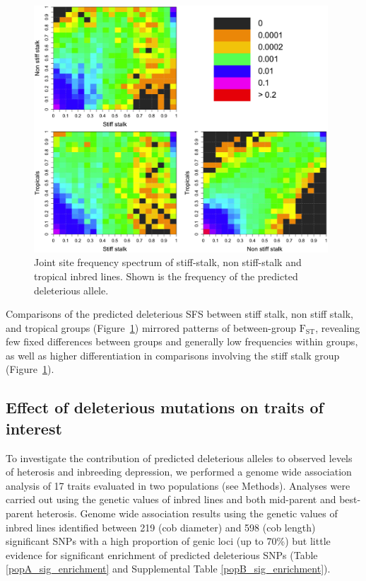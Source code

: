 \documentclass[12pt]{article}
\begin{document}
\begin{figure}[!b]
  \begin{center}
   \includegraphics[width=110mm]{joinSFS.png}
    \caption{Joint site frequency spectrum of stiff-stalk, non stiff-stalk and tropical inbred lines. Shown is the frequency of the predicted deleterious allele.}
   \label{jfs}
  \end{center}
\end{figure}

Comparisons of the predicted deleterious SFS between stiff stalk, non stiff stalk, and tropical groups (Figure~\ref{jfs}) mirrored patterns of between-group  $\mathrm{F}_{\mathrm{ST}}$, revealing few fixed differences between groups and generally low frequencies within groups, as well as higher differentiation in comparisons involving the stiff stalk group (Figure~\ref{jfs}).

\subsection*{Effect of deleterious mutations on traits of interest}

To investigate the contribution of predicted deleterious alleles to observed levels of heterosis and inbreeding depression, we performed a genome wide association analysis of 17 traits evaluated in two populations (see Methods). Analyses were carried out using the genetic values of inbred lines and both mid-parent and best-parent heterosis. Genome wide association results using the genetic values of inbred lines identified between 219 (cob diameter) and 598 (cob length) significant SNPs with a high proportion of genic loci (up to 70\%) but little evidence for significant enrichment of predicted deleterious SNPs (Table \ref{popA_sig_enrichment} and Supplemental Table \ref{popB_sig_enrichment}). 
\end{document}
